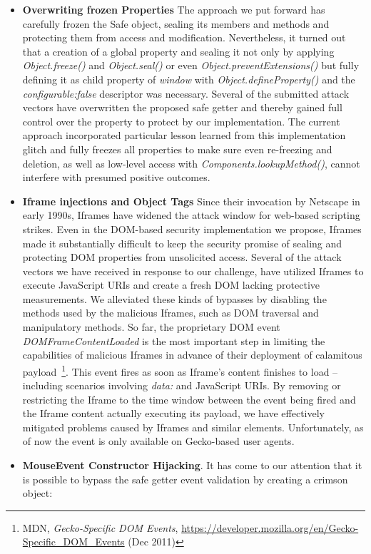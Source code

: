 \begin{itemize}
	\item \textbf{Overwriting frozen Properties} The approach we put forward has carefully frozen the Safe object, sealing its members and methods and protecting them from access and modification. Nevertheless, it turned out that a creation of a global property and sealing it not only by applying \textit{Object.freeze()} and \textit{Object.seal()} or even \textit{Object.preventExtensions()} but fully defining it as child property of \textit{window} with \textit{Object.defineProperty()} and the \textit{configurable:false} descriptor was necessary. Several of the submitted attack vectors have overwritten the proposed safe getter and thereby gained full control over the property to protect by our implementation. The current approach incorporated particular lesson learned from this implementation glitch and fully freezes all properties to make sure even re-freezing and deletion, as well as low-level access with \textit{Components.lookupMethod()}, cannot interfere with presumed positive outcomes. 
	\item \textbf{Iframe injections and Object Tags} Since their invocation by Netscape in early 1990s, Iframes have widened the attack window for web-based scripting strikes. Even in the DOM-based security implementation we propose, Iframes made it substantially difficult to keep the security promise of sealing and protecting DOM properties from unsolicited access. Several of the attack vectors we have received in response to our challenge, have utilized Iframes to execute JavaScript URIs and create a fresh DOM lacking protective measurements. We alleviated these kinds of bypasses by disabling the methods used by the malicious Iframes, such as DOM traversal and manipulatory methods. So far, the proprietary DOM event \textit{DOMFrameContentLoaded} is the most important step in limiting the capabilities of malicious Iframes in advance of their deployment of calamitous payload~\footnote{MDN, \textit{Gecko-Specific DOM Events}, \url{https://developer.mozilla.org/en/Gecko-Specific_DOM_Events} (Dec 2011)}. This event fires as soon as Iframe's content finishes to load -- including scenarios involving \textit{data:} and JavaScript URIs. By removing or restricting the Iframe to the time window between the event being fired and the Iframe content actually executing its payload, we have effectively mitigated problems caused by Iframes and similar elements. Unfortunately, as of now the event is only available on Gecko-based user agents.
	\item \textbf{MouseEvent Constructor Hijacking}. It has come to our attention that it is possible to bypass the safe getter event validation by creating a crimson object:\\

\end{itemize}
